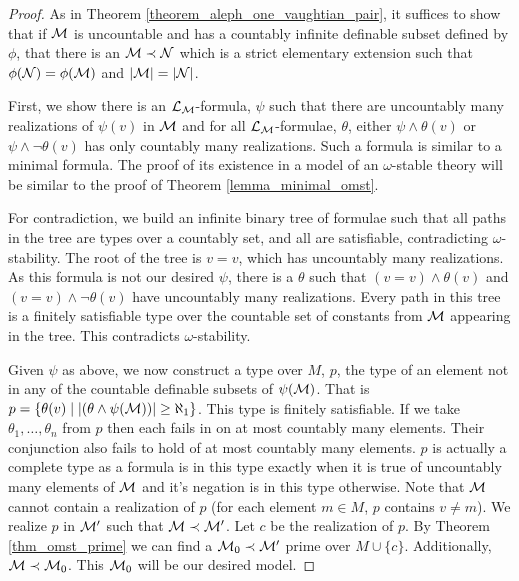 \begin{proof}
As in Theorem \ref{theorem_aleph_one_vaughtian_pair}, it suffices to show that if \(\mathcal{M}\) is uncountable and has a countably infinite definable subset defined by \(\phi\), that there is an \(\mathcal{M} \prec \mathcal{N}\) which is a strict elementary extension such that \(\phi(\mathcal{N}) = \phi(\mathcal{M})\) and \(|\mathcal{M}| = |\mathcal{N}|\).

First, we show there is an \(\mathcal{L}_{\mathcal{M}}\)-formula, \(\psi\) such that there are uncountably many realizations of \(\psi(v)\) in \(\mathcal{M}\) and for all \(\mathcal{L}_{\mathcal{M}}\)-formulae, \(\theta\), either \(\psi \land \theta(v)\) or \(\psi \land \neg\theta(v)\) has only countably many realizations. 
Such a formula is similar to a minimal formula. 
The proof of its existence in a model of an \(\omega\)-stable theory will be similar to the proof of Theorem \ref{lemma_minimal_omst}.

For contradiction, we build an infinite binary tree of formulae such that all paths in the tree are types over a countably set, and all are satisfiable, contradicting \(\omega\)-stability.
The root of the tree is \(v = v\), which has uncountably many realizations. 
As this formula is not our desired \(\psi\), there is a \(\theta\) such that \((v = v) \land \theta(v)\) and \((v = v) \land \neg \theta(v)\) have uncountably many realizations. 
Every path in this tree is a finitely satisfiable type over the countable set of constants from \(\mathcal{M}\) appearing in the tree.
This contradicts \(\omega\)-stability. 

Given \(\psi\) as above, we now construct a type over \(M\), \(p\), the type of an element not in any of the countable definable subsets of \(\psi(\mathcal{M})\). 
That is \(p = \{\theta(v) \mid |(\theta \land \psi (\mathcal{M}))| \geq \aleph_1\}\).
This type is finitely satisfiable. If we take \(\theta_1, \ldots, \theta_n\) from \(p\) then each fails in on at most countably many elements. 
Their conjunction also fails to hold of at most countably many elements. 
\(p\) is actually a complete type as a formula is in this type  exactly when it is true of uncountably many elements of \(\mathcal{M}\) and it's negation is in this type otherwise. 
Note that \(\mathcal{M}\) cannot contain a realization of \(p\) (for each element \(m \in M\), \(p\) contains \(v \neq m\)). 
We realize \(p\) in \(\mathcal{M}'\) such that \(\mathcal{M} \prec \mathcal{M}'\). 
Let \(c\) be the realization of \(p\). 
By Theorem \ref{thm_omst_prime} we can find a \(\mathcal{M}_0 \prec \mathcal{M}'\) prime over \(M \cup \{c\}\). 
Additionally, \(\mathcal{M} \prec \mathcal{M}_0\). 
This \(\mathcal{M}_0\) will be our desired model. 


\end{proof}
